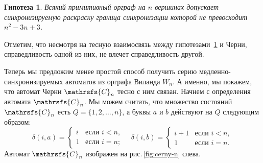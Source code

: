 \documentclass[11pt]{article}
\newcommand{\sa}{synchronizing automata}
\newcommand{\sws}{reset words}
\newtheorem{conjecture}{Гипотеза}
\begin{document}


\begin{conjecture}
\label{hybrid}
Всякий примитивный орграф на $n$ вершинах допускает синхронизируемую раскраску
граница синхронизации которой не превосходит $n^2-3n+3$.

\end{conjecture}


Отметим, что несмотря на тесную взаимосвязь между гипотезами~\ref{hybrid} и Черни,
справедливость одной из них, не влечет справедливость другой.



Теперь мы предложим менее простой способ получить серию медленно-синхронизируемых
автоматов из орграфа Виланда $W_n$. А именно, мы покажем, что автомат 
Черни $\mathrsfs{C}_n$ тесно с ним связан. Начнем с определения автомата $\mathrsfs{C}_n$. 
Мы можем считать, что множество состояний $\mathrsfs{C}_n$ есть $Q=\{1,2,\dots,n\}$,
а буквы $a$ и $b$ действуют на $Q$ следующим образом:
$$\delta(i,a)=\begin{cases}
i &\text{если } i<n,\\
1 &\text{если } i=n;
\end{cases}\quad
\delta(i,b)=\begin{cases}
i+1 &\text{если } i<n,\\
1 &\text{если } i=n.
\end{cases}$$
Автомат $\mathrsfs{C}_n$ изображен на рис.\,\ref{fig:cerny-n} слева.
\end{document}
